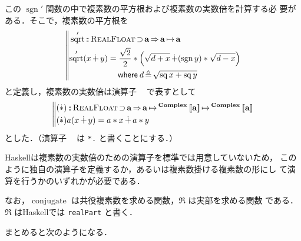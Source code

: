 \documentclass[a5paper,twoside,fleqn,draft]{jsbook}
\def\[{\left[\!\left[}
\def\]{\right]\!\right]}
\DeclareMathOperator{\sgn}{sgn}
\newcommand{\programminglanguage}[1]{\textsf{#1}}
\newcommand{\haskell}{\programminglanguage{Haskell}}
\newcommand{\code}[1]{\texttt{#1}}
\newenvironment{haskellcode}{\begin{itembox}[r]{\haskell}}{\end{itembox}}
\newcommand{\mBrace}{\Vert}
\newcommand{\mKeyword}[1]{\mathsf{#1}} %
\newcommand{\mWhereKeyword}{\mKeyword{where}}
\DeclareMathOperator{\mSuperClass}{\Rightarrow}
\DeclareMathOperator{\mSuperSet}{\supset}
\newcommand{\mSpecialFunc}[1]{\mathrm{#1}}
\DeclareMathOperator{\mConjugate}{\mSpecialFunc{conjugate}}
\DeclareMathOperator{\mSq}{\mSpecialFunc{sq}}
\DeclareMathOperator{\mSqrt}{\mSpecialFunc{sqrt}}
\DeclareMathOperator{\mComplexPlus}{\dotplus}
\DeclareMathOperator{\mComplexTimes}{\Dot\ast}
\DeclareMathOperator{\mIn}{{:\!:}}
\DeclareMathOperator{\mLetEq}{\triangleq}
\DeclareMathOperator{\mMapsTo}{\mapsto}
\newcommand{\mType}[1]{\mathbf{#1}}
\newcommand{\mGenericTypeAssemble}[2]{{}^{\mType{#1}}\[\mType{#2}\]}
\newcommand{\mComplexType}[1]{\mGenericTypeAssemble{Complex}{#1}}
\newcommand{\mGenericTypeClass}[1]{\textsc{#1}} %
\newcommand{\mRealFloatTypeClass}{\mGenericTypeClass{RealFloat}}
\newcommand{\mProj}[2]{#1\mMapsTo#2}
\newcommand{\mWhereIs}[2]{\mathbin{\mWhereKeyword}#1\mLetEq#2}
\begin{document}
この $\sgn'$ 関数の中で複素数の平方根および複素数の実数倍を計算する必
要がある．そこで，複素数の平方根を
\begin{equation}
  \left\mBrace
  \begin{aligned}
    &\mSqrt'\mIn\mRealFloatTypeClass\mSuperSet\mType{a}
    \mSuperClass\mProj{\mType{a}}{\mType{a}}\\
    &\begin{aligned}
       \mSqrt'(x\mComplexPlus y)
       &=\frac{\sqrt{2}}{2}*\left(\sqrt{d+x}\mComplexPlus(\sgn y)*\sqrt{d-x}\right)\\
       &\quad\mWhereIs{d}{\sqrt{\mSq x+\mSq y}}
     \end{aligned}
  \end{aligned}
  \right.
\end{equation}
と定義し，複素数の実数倍は演算子 $\mComplexTimes$ で表すとして
\begin{equation}
  \left\mBrace
  \begin{aligned}
    &(\mComplexTimes)\mIn\mRealFloatTypeClass\mSuperSet\mType{a}\mSuperClass
    \mProj{\mType{a}}{\mProj{\mComplexType{a}}{\mComplexType{a}}}\\
    &(\mComplexTimes)a(x\mComplexPlus y)=a*x\mComplexPlus a*y
  \end{aligned}
  \right.
\end{equation}
とした．（演算子 $\mComplexTimes$ は \code{*.} と書くことにする．）

\haskell は複素数の実数倍のための演算子を標準では用意していないため，
このように独自の演算子を定義するか，あるいは複素数掛ける複素数の形にし
て演算を行うかのいずれかが必要である．


なお，$\mConjugate$ は共役複素数を求める関数，$\Re$ は実部を求める関数
である．$\Re$ は\haskell では \code{realPart} と書く．

まとめると次のようになる．
\end{document}
